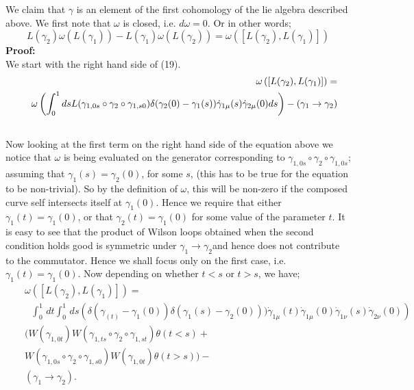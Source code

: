 \documentclass[a4paper,12]{article}
\begin{document}
We claim that $\gamma $ is an element of the first cohomology of the lie 
algebra described above. We first note that $\omega $ is closed, i.e. 
$d\omega = 0$. Or in other words;
\begin{equation}
L(\gamma _2 )\omega (L(\gamma _1)) - L(\gamma _1)\omega (L(\gamma _2)) = 
\omega \left([L(\gamma _2),L(\gamma _1)]\right)
\end{equation}
{\bf Proof:}\\
We start with the right hand side of (19).
\begin{eqnarray}
&&\omega \left([L(\gamma _2),L(\gamma_1 )]\right) = \nonumber \\
&&\hbox{ }\omega \left( \int_0 ^1 
ds L(\gamma_{1,0s}\circ\gamma _2 \circ \gamma _{1,s0})\delta (\gamma 
_2(0) - \gamma _1(s))\dot{\gamma }_{1\mu }(s)\dot{\gamma }_{2\mu 
}(0)ds\right) - \left(\gamma _1 \rightarrow \gamma _2 \right)\nonumber\\
&&\hbox{ }
\end{eqnarray}
Now looking at the first term on the right hand side of the equation above 
we notice that 
$\omega $ is being evaluated on the generator corresponding to $\gamma 
_{1,0s}\circ \gamma _2 \circ \gamma _{1,0s}$; assuming that $\gamma _1(s) 
= 
\gamma _2(0)$, for some $s$, (this has to be true for the equation to be 
non-trivial).  So by the definition of $\omega $, this will be non-zero if 
the composed curve self intersects itself at $\gamma _1(0)$. Hence we 
require that either $\gamma _1(t) = \gamma _1(0)$, or that 
$\gamma _2(t) = \gamma _1(0)$ for some value of the parameter $t$. It is 
easy to see that the product of Wilson loops obtained when the second 
condition holds good is symmetric under $\gamma _1 \rightarrow \gamma 
_2$and hence does not contribute to the commutator. Hence we shall focus 
only on the first case, i.e. $\gamma _1(t) = \gamma _1(0)$. Now depending 
on whether $t<s $ or $t>s$, we have;
\begin{eqnarray}
&&\omega \left([L(\gamma _2),L(\gamma _1)]\right) = \nonumber\\
&&\mbox{ }\int_0^1\,dt\int_0^1\,ds \left(\delta(\gamma _(t) - \gamma _1(0))\delta 
(\gamma _1(s) - 
\gamma _2(0)) )\dot{\gamma }_{1\mu }(t)\dot{\gamma }_{1\mu }(0)
\dot{\gamma }_{1\nu }(s)\dot{\gamma }_{2\nu
}(0) \right)\nonumber\\
&&(W(\gamma _{1,0t})W(\gamma _{1,ts}\circ \gamma _2 \circ \gamma 
_{1,st})\theta (t<s) +\nonumber\\
& & W(\gamma _{1,0s}\circ \gamma _2 \circ \gamma _{1,s0})W(\gamma 
_{1,0t})\theta 
(t>s) ) - \nonumber \\
& &(\gamma _1 \rightarrow \gamma _2). 
\end{eqnarray}
\end{document}
